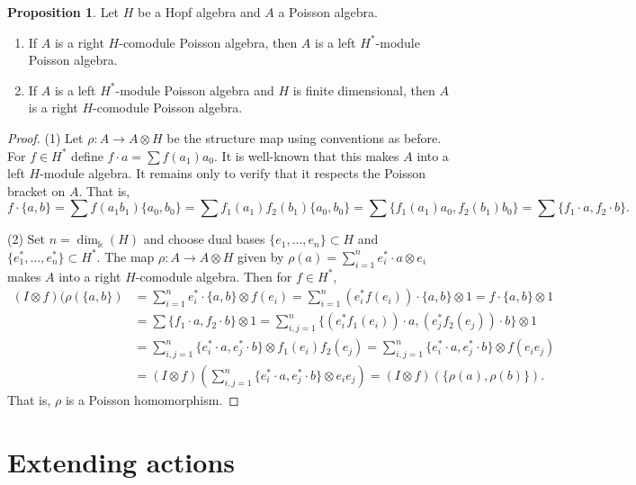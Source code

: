 \documentclass[reqno]{amsart}
\numberwithin{equation}{section}
\theoremstyle{definition}
\newtheorem{proposition}[theorem]{Proposition}
\DeclareMathOperator\id{id}
\newcommand\tensor{\otimes}
\newcommand\kk{\Bbbk}
\begin{document}
\begin{proposition}
Let $H$ be a Hopf algebra and $A$ a Poisson algebra.
\begin{enumerate}
\item If $A$ is a right $H$-comodule Poisson algebra, then $A$ is a left $H^*$-module Poisson algebra.
\item If $A$ is a left $H^*$-module Poisson algebra and $H$ is finite dimensional, then $A$ is a right $H$-comodule Poisson algebra.
\end{enumerate}
\end{proposition}
\begin{proof}
(1) Let $\rho:A \to A \tensor H$ be the structure map 
using conventions as before. For $f \in H^*$ define $f \cdot a = \sum f(a_1)a_0$. 
It is well-known that this makes $A$ into a left $H$-module algebra. It remains only to verify that it respects the Poisson bracket on $A$.  That is,
\[ 
f \cdot \{a,b\} 
	= \sum f(a_1b_1) \{ a_0, b_0 \}
	= \sum f_1(a_1) f_2(b_1) \{ a_0, b_0 \}
	= \sum \{ f_1(a_1) a_0, f_2(b_1)  b_0 \}
	= \sum \{ f_1 \cdot a, f_2 \cdot b \}.
\]

(2) Set $n=\dim_\kk(H)$ and choose dual bases $\{e_1,\hdots,e_n\} \subset H$ and $\{e_1^*,\hdots,e_n^*\} \subset H^*$. The map $\rho: A \to A \tensor H$ given by
$\rho(a) = \sum_{i=1}^n e_i^* \cdot a \tensor e_i$ makes $A$ into a right $H$-comodule algebra. 
Then for $f \in H^*$,
\begin{align*}
(I \tensor f)(\rho(\{a,b\})
	&= \sum_{i=1}^n e_i^* \cdot \{a,b\} \tensor f(e_i)
	= \sum_{i=1}^n \left( e_i^* f(e_i) \right) \cdot \{a,b\} \tensor 1
	= f \cdot \{a,b\} \tensor 1 \\
	&= \sum \{ f_1 \cdot a, f_2 \cdot b \} \tensor 1
	= \sum_{i,j = 1}^n \{ \left( e_i^* f_1(e_i) \right) \cdot a, \left( e_j^* f_2(e_j) \right) \cdot b \} \tensor 1 \\
	&= \sum_{i,j = 1}^n \{ e_i^* \cdot a, e_j^* \cdot b \} \tensor f_1(e_i)f_2(e_j)
	= \sum_{i,j = 1}^n \{ e_i^* \cdot a, e_j^* \cdot b \} \tensor f(e_ie_j) \\
	&= (I \tensor f)\left( \sum_{i,j = 1}^n \{ e_i^* \cdot a, e_j^* \cdot b \} \tensor e_ie_j \right)
	= (I \tensor f)( \{ \rho(a), \rho(b) \} ).
\end{align*}
That is, $\rho$ is a Poisson homomorphism.
\end{proof}

\section{Extending actions}
\label{sec.extension}
\end{document}
